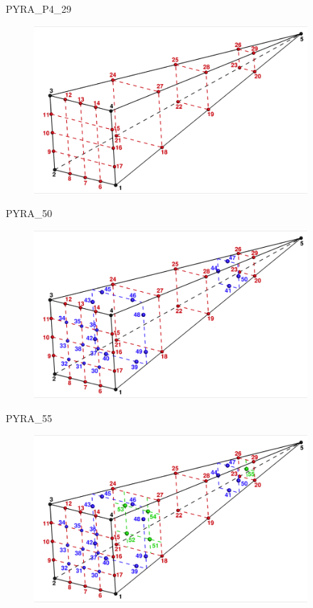 {{{PYRA\_P4\_29
\begin{figure}[!htb]
   \includegraphics[width=4in]{conv.figs/TecplotFiles_Quartic_Element/All_Figures/Pyra_p4_29}
\end{figure}

\bigskip

PYRA\_50
\begin{figure}[!htb]
   \includegraphics[width=4in]{conv.figs/TecplotFiles_Quartic_Element/All_Figures/Pyra_50}
\end{figure}

\newpage
PYRA\_55
\begin{figure}[!htb]
   \includegraphics[width=4in]{conv.figs/TecplotFiles_Quartic_Element/All_Figures/Pyra_55}
\end{figure}

}}}
